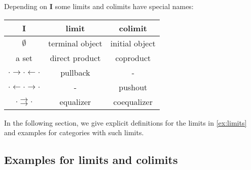 \begin{example}\label{ex:limits}
Depending on \textbf{I} some limits and colimits have special names:
\begin{center}
\begin{tabular}{c|c|c}
\textbf{I} & limit & colimit \\
\hline
$\emptyset$ & terminal object & initial object \\
a set & direct product & coproduct \\
$\cdot \rightarrow \cdot \leftarrow \cdot$ & pullback & - \\
$\cdot \leftarrow \cdot \rightarrow \cdot$  & - & pushout \\
$ \cdot \rightrightarrows \cdot$ & equalizer & coequalizer
\end{tabular}
\end{center}
\end{example}

In the following section, we give explicit definitions for the limits in \ref{ex:limits} and examples for categories with such limits.

\subsection{Examples for limits and colimits}

